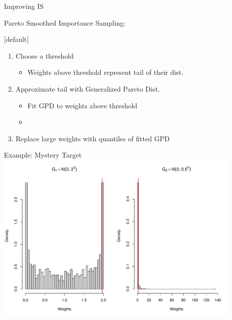 \documentclass[14pt]{beamer}
\begin{document}
\begin{frame}{Improving IS}
    \begin{outline}
    \1 Pareto Smoothed Importance Sampling:
        \2 \citep{Veh24} \newline
    \end{outline}

    [default]
    \begin{enumerate}
    \item Choose a threshold
        \begin{itemize}
            \item Weights above threshold represent tail of their dist.
        \end{itemize}
    \item Approximate tail with Generalized Pareto Dist.
    \begin{itemize}
        \item Fit GPD to weights above threshold
        \item \citep{Zha09}
    \end{itemize}
    \item Replace large weights with quantiles of fitted GPD
    \end{enumerate}
\end{frame}

\begin{frame}{Example: Mystery Target}
    \centering
    \includegraphics[height=0.9\textheight, width=0.9\textwidth, keepaspectratio]{Figures/Wt Hist - Pareto Thresh.pdf}
\end{frame}
\end{document}
